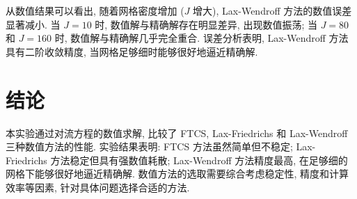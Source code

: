 \documentclass[12pt,a4paper]{article}
\begin{document}
            从数值结果可以看出, 随着网格密度增加 ($ J $ 增大), Lax-Wendroff 方法的数值误差显著减小. 当 $ J = 10 $ 时, 数值解与精确解存在明显差异, 出现数值振荡; 当 $ J = 80 $ 和 $ J = 160 $ 时, 数值解与精确解几乎完全重合. 误差分析表明, Lax-Wendroff 方法具有二阶收敛精度, 当网格足够细时能够很好地逼近精确解.

    \section{结论}
        本实验通过对流方程的数值求解, 比较了 FTCS, Lax-Friedrichs 和 Lax-Wendroff 三种数值方法的性能. 实验结果表明: FTCS 方法虽然简单但不稳定; Lax-Friedrichs 方法稳定但具有强数值耗散; Lax-Wendroff 方法精度最高, 在足够细的网格下能够很好地逼近精确解. 数值方法的选取需要综合考虑稳定性, 精度和计算效率等因素, 针对具体问题选择合适的方法.
\end{document}
